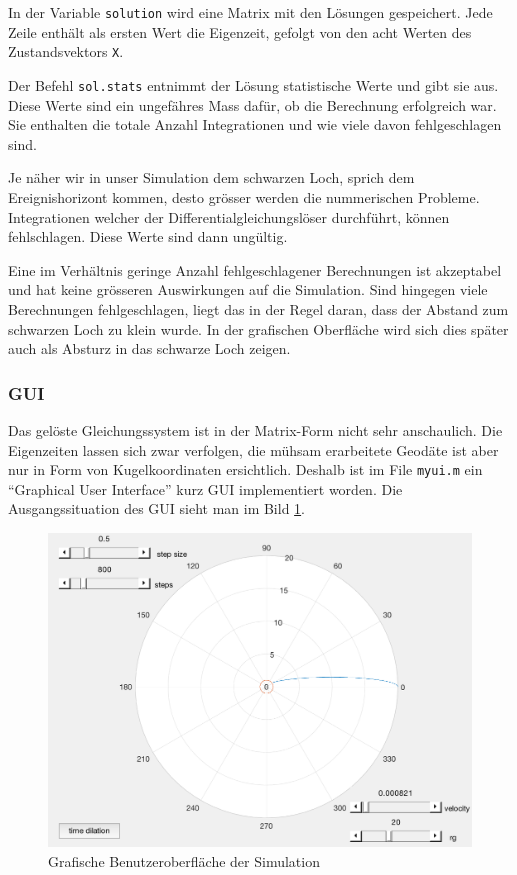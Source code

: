 \begin{refsection}
    In der Variable \texttt{solution} wird eine Matrix mit den Lösungen gespeichert. Jede Zeile enthält als ersten Wert die Eigenzeit, gefolgt von den acht Werten des Zustandsvektors \texttt{X}.
    
    Der Befehl \texttt{sol.stats} entnimmt der Lösung statistische Werte und gibt sie aus. Diese Werte sind ein ungefähres Mass dafür, ob die Berechnung erfolgreich war. Sie enthalten die totale Anzahl Integrationen und wie viele davon fehlgeschlagen sind.
    
    Je näher wir in unser Simulation dem schwarzen Loch, sprich dem Ereignishorizont kommen, desto grösser werden die nummerischen Probleme. Integrationen welcher der Differentialgleichungslöser durchführt, können fehlschlagen. Diese Werte sind dann ungültig.
    
    Eine im Verhältnis geringe Anzahl fehlgeschlagener Berechnungen ist akzeptabel und hat keine grösseren Auswirkungen auf die Simulation. Sind hingegen viele Berechnungen fehlgeschlagen, liegt das in der Regel daran, dass der Abstand zum schwarzen Loch zu klein wurde. In der grafischen Oberfläche wird sich dies später auch als Absturz in das schwarze Loch zeigen.
    
    \subsubsection{GUI}
    Das gelöste Gleichungssystem ist in der Matrix-Form nicht sehr anschaulich. Die Eigenzeiten lassen sich zwar verfolgen, die mühsam erarbeitete Geodäte ist aber nur in Form von Kugelkoordinaten ersichtlich. Deshalb ist im File \texttt{myui.m} ein ``Graphical User Interface'' kurz GUI implementiert worden. Die Ausgangssituation des GUI sieht man im Bild \ref{skript:zeitreisen:fig:gui}.
    \begin{figure}
        \centering
        \includegraphics[width=12cm]{zeitreisen/gui.png}
        \caption{Grafische Benutzeroberfläche der Simulation}
        \label{skript:zeitreisen:fig:gui} 
    \end{figure}
    

\end{refsection}
